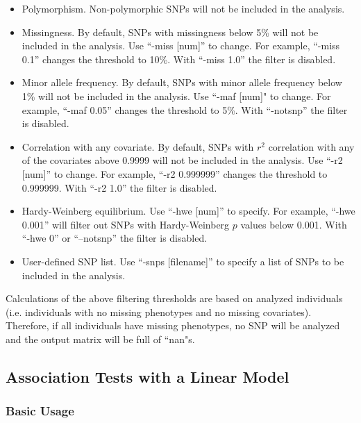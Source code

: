 \documentclass[11pt]{article}
\begin{document}
\begin{itemize}

\item Polymorphism. Non-polymorphic SNPs will not be included in the
  analysis.

\item Missingness. By default, SNPs with missingness below 5\% will
  not be included in the analysis. Use ``-miss [num]'' to change. For
  example, ``-miss 0.1'' changes the threshold to 10\%. With
  ``-miss 1.0'' the filter is disabled.

\item Minor allele frequency. By default, SNPs with minor allele
  frequency below 1\% will not be included in the analysis. Use ``-maf
  [num]" to change. For example, ``-maf 0.05'' changes the threshold
  to 5\%. With ``-notsnp'' the filter is disabled.

\item Correlation with any covariate. By default, SNPs with $r^2$
  correlation with any of the covariates above 0.9999 will not be
  included in the analysis. Use ``-r2 [num]'' to change. For example,
  ``-r2 0.999999'' changes the threshold to 0.999999.  With ``-r2
  1.0'' the filter is disabled.

\item Hardy-Weinberg equilibrium. Use ``-hwe [num]'' to specify. For
  example, ``-hwe 0.001'' will filter out SNPs with Hardy-Weinberg $p$
  values below 0.001.  With ``-hwe 0'' or ``--notsnp'' the filter is
  disabled.

\item User-defined SNP list. Use ``-snps [filename]'' to specify a
  list of SNPs to be included in the analysis.

\end{itemize}

Calculations of the above filtering thresholds are based on analyzed
individuals (i.e. individuals with no missing phenotypes and no
missing covariates). Therefore, if all individuals have missing
phenotypes, no SNP will be analyzed and the output matrix will be full
of ``nan"s.

\subsection{Association Tests with a Linear Model}

\subsubsection{Basic Usage}
\end{document}
